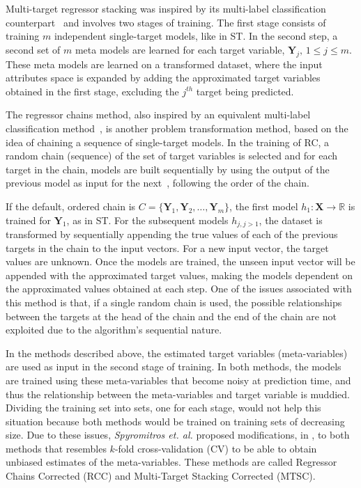\documentclass[reqno]{vcuthesis}
\numberwithin{equation}{chapter}
\begin{document}
Multi-target regressor stacking was inspired by its multi-label classification counterpart~\cite{godbole2004discriminative} and involves two stages of training. The first stage consists of training $m$ independent single-target models, like in ST. In the second step, a second set of $m$ meta models are learned for each target variable, $\bm{Y}_j,\, 1 \leq j \leq m$. These meta models are learned on a transformed dataset, where the input attributes space is expanded by adding the approximated target variables obtained in the first stage, excluding the $j^{th}$ target being predicted.

The regressor chains method, also inspired by an equivalent multi-label classification method~\cite{read2011classifier}, is another problem transformation method, based on the idea of chaining a sequence of single-target models. In the training of RC, a random chain (sequence) of the set of target variables is selected and for each target in the chain, models are built sequentially by using the output of the previous model as input for the next~\cite{Xioufis2016}, following the order of the chain. 

If the default, ordered chain is $C = \{\bm Y_1, \bm Y_2, \ldots, \bm Y_m\}$, the first model $h_1 : \bm X \rightarrow \mathbb{R}$ is trained for $\bm Y_1$, as in ST. For the subsequent models $h_{j,j>1}$, the dataset is transformed by sequentially appending the true values of each of the previous targets in the chain to the input vectors. For a new input vector, the target values are unknown. Once the models are trained, the unseen input vector will be appended with the approximated target values, making the models dependent on the approximated values obtained at each step. One of the issues associated with this method is that, if a single random chain is used, the possible relationships between the targets at the head of the chain and the end of the chain are not exploited due to the algorithm's sequential nature. 

In the methods described above, the estimated target variables (meta-variables) are used as input in the second stage of training. In both methods, the models are trained using these meta-variables that become noisy at prediction time, and thus the relationship between the meta-variables and target variable is muddied. Dividing the training set into sets, one for each stage, would not help this situation because both methods would be trained on training sets of decreasing size. Due to these issues, \textit{Spyromitros et. al.} proposed modifications, in \cite{Spyromitros2014}, to both methods that resembles $k$-fold cross-validation (CV) to be able to obtain unbiased estimates of the meta-variables. These methods are called Regressor Chains Corrected (RCC) and Multi-Target Stacking Corrected (MTSC). 
\end{document}
